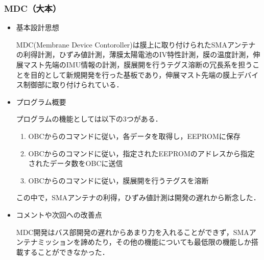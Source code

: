 \subsubsection{MDC（大本）}

\begin{itemize}
	\item 基本設計思想\par
	MDC(Membrane Device Contoroller)は膜上に取り付けられたSMAアンテナの利得計測，ひずみ値計測，薄膜太陽電池のIV特性計測，膜の温度計測，伸展マスト先端のIMU情報の計測，膜展開を行うテグス溶断の冗長系を担うことを目的として新規開発を行った基板であり，伸展マスト先端の膜上デバイス制御部に取り付けられている．
	
	
	\item プログラム概要\par
	プログラムの機能としては以下の3つがある．
	\begin{enumerate}
		\item OBCからのコマンドに従い，各データを取得し，EEPROMに保存
		\item OBCからのコマンドに従い，指定されたEEPROMのアドレスから指定されたデータ数をOBCに送信
		\item OBCからのコマンドに従い，膜展開を行うテグスを溶断
	\end{enumerate}
	この中で，SMAアンテナの利得，ひずみ値計測は開発の遅れから断念した．
	
	\item コメントや次回への改善点\par
	MDC開発はバス部開発の遅れからあまり力を入れることができず，SMAアンテナミッションを諦めたり，その他の機能についても最低限の機能しか搭載することができなかった．
	
\end{itemize}


